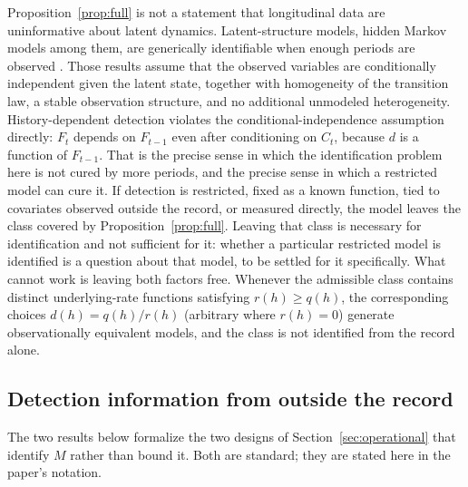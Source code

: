 Proposition~\ref{prop:full} is not a statement that longitudinal data are
uninformative about latent dynamics. Latent-structure models, hidden Markov
models among them, are generically identifiable when enough periods are
observed \citep{allman2009}. Those results assume that the observed variables
are conditionally independent given the latent state, together with
homogeneity of the transition law, a stable observation structure, and no
additional unmodeled heterogeneity. History-dependent detection violates the
conditional-independence assumption directly: $F_t$ depends on $F_{t-1}$ even
after conditioning on $C_t$, because $d$ is a function of $F_{t-1}$. That is
the precise sense in which the identification problem here is not cured by
more periods, and the precise sense in which a restricted model can cure it.
If detection is restricted, fixed as a known function, tied to covariates
observed outside the record, or measured directly, the model leaves the class
covered by Proposition~\ref{prop:full}. Leaving that class is necessary for
identification and not sufficient for it: whether a particular restricted
model is identified is a question about that model, to be settled for it
specifically. What cannot work is leaving both factors free. Whenever the
admissible class contains distinct underlying-rate functions satisfying $r(h)
\ge q(h)$, the corresponding choices $d(h) = q(h)/r(h)$ (arbitrary where $r(h)
= 0$) generate observationally equivalent models, and the class is not
identified from the record alone.

\subsection{Detection information from outside the record}

The two results below formalize the two designs of
Section~\ref{sec:operational} that identify $M$ rather than bound it. Both
are standard; they are stated here in the paper's notation.

